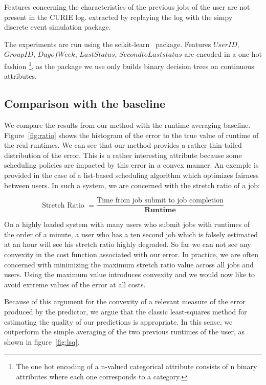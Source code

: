 \documentclass{article}
\begin{document}
Features concerning the characteristics of the previous jobs of the user are not present in the CURIE log. extracted by replaying the log with the simpy~\cite{simpy} discrete event simulation package.

The experiments are run using the scikit-learn~\cite{scikit-learn} package. Features $User ID$, $ Group ID$, $ Day of Week$, $ Last Status$, $ Second to Last status$ are encoded in a one-hot fashion \footnote{The one hot encoding of a n-valued categorical attribute consists of n binary attributes where each one corresponds to a category.}, as the package we use only builds binary decision trees on continuous attributes.

\subsection{Comparison with the baseline}
\label{sub:comparison_with_average_baseline}
We compare the results from our method with the runtime averaging baseline.
Figure~\ref{fig:ratio} shows the histogram of the error to the true value of runtime of the real runtimes.
We can see that our method provides a rather thin-tailed distribution of the error.
This is a rather interesting attribute because some scheduling policies are impacted by this error in a convex manner.
An exemple is provided in the case of a list-based scheduling algorithm which optimizes fairness between users. In such a system, we are concerned with the stretch ratio of a job:

\[
  \mbox{Stretch Ratio } = \frac{\mbox{Time from job submit to job completion}}{\textbf{Runtime}}
\]

On a highly loaded system with many users who submit jobs with runtimes of the order of a minute, a user who has a ten second job which is falsely estimated at an hour will see his stretch ratio highly degraded.
So far we can not see any convexity in the cost function associated with our error. In practice, we are often concerned with minimizing the maximum stretch ratio value across all jobs and users. Using the maximum value introduces convexity and we would now like to avoid extreme values of the error at all costs.

Because of this argument for the convexity of a relevant measure of the error produced by the predictor, we argue that the classic least-squares method for estimating the quality of our predictions is appropriate.
In this sense, we outperform the simple averaging of the two previous runtimes of the user, as shown in figure~\ref{fig:lsq}.
\end{document}

